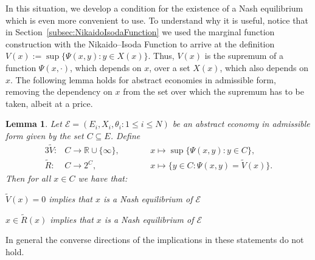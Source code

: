 \documentclass[a4paper,11pt,reqno,english]{amsart}
\newtheorem{lemma}[theorem]{Lemma}
\theoremstyle{definition}
\begin{document}
In this situation, we develop a condition for the existence of a Nash equilibrium which is even more convenient to use. To understand why it is useful, notice that in Section~\ref{subsec:NikaidoIsodaFunction} we used the marginal function construction with the Nikaido--Isoda Function to arrive at the definition $V(x) := \sup\{\Psi(x,y)\colon y\in X(x)\}$. Thus, $V(x)$ is the supremum of a function $\Psi(x,\cdot)$, which depends on $x$, over a set $X(x)$, which also depends on $x$. The following lemma holds for abstract economies in admissible form, removing the dependency on $x$ from the set over which the supremum has to be taken, albeit at a price.

\begin{lemma}\label{lem:ConditionAbstractEconomyAdmissibleForm}
	Let $\mathcal{E}=(E_i,X_i,\theta_i\colon 1\leq i\leq N)$ be an abstract economy in admissible form given by the set $C\subseteq E$. Define
	\begin{alignat*}{3}
		\widetilde{V}\colon & C\longrightarrow\mathbb{R}\cup\{\infty\}, & \qquad & x \longmapsto  \sup\{\Psi(x, y) \colon y\in C\},                \\
		\widetilde{R}\colon & C\longrightarrow 2^{C},                   & \qquad & x \longmapsto    \{y\in C\colon \Psi(x,y) = \widetilde{V}(x)\}.
	\end{alignat*}
	Then for all $x\in C$ we have that:
	\begin{compactenum}[\rm \quad (1)]
		\item $\widetilde{V}(x) = 0$ implies that $x$ is a Nash equilibrium of $\mathcal{E}$
		\item $x \in \widetilde{R}(x)$ implies that $x$ is a Nash equilibrium of $\mathcal{E}$
	\end{compactenum}
\end{lemma}

\noindent
In general the converse directions of the implications in these statements do not hold.
\end{document}
